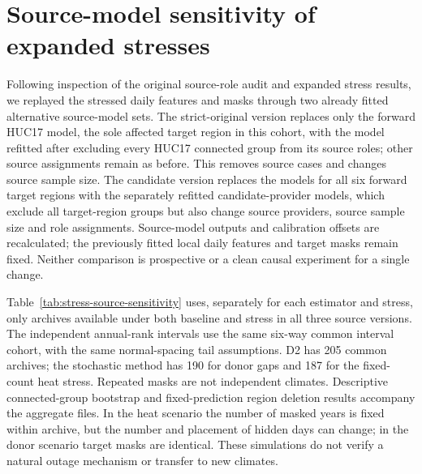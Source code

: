 \section{Source-model sensitivity of expanded stresses}
Following inspection of the original source-role audit and expanded stress results, we replayed the stressed daily features and masks through two already fitted alternative source-model sets. The strict-original version replaces only the forward HUC17 model, the sole affected target region in this cohort, with the model refitted after excluding every HUC17 connected group from its source roles; other source assignments remain as before. This removes source cases and changes source sample size. The candidate version replaces the models for all six forward target regions with the separately refitted candidate-provider models, which exclude all target-region groups but also change source providers, source sample size and role assignments. Source-model outputs and calibration offsets are recalculated; the previously fitted local daily features and target masks remain fixed. Neither comparison is prospective or a clean causal experiment for a single change.

Table~\ref{tab:stress-source-sensitivity} uses, separately for each estimator and stress, only archives available under both baseline and stress in all three source versions. The independent annual-rank intervals use the same six-way common interval cohort, with the same normal-spacing tail assumptions. D2 has 205 common archives; the stochastic method has 190 for donor gaps and 187 for the fixed-count heat stress. Repeated masks are not independent climates. Descriptive connected-group bootstrap and fixed-prediction region deletion results accompany the aggregate files. In the heat scenario the number of masked years is fixed within archive, but the number and placement of hidden days can change; in the donor scenario target masks are identical. These simulations do not verify a natural outage mechanism or transfer to new climates.

